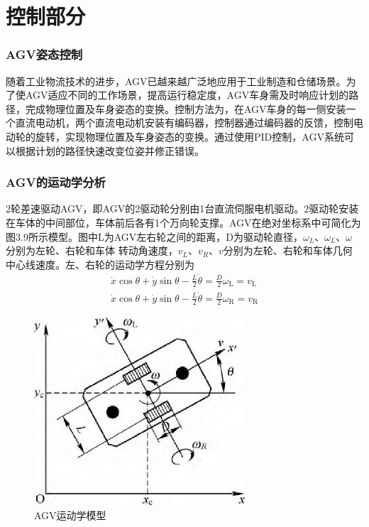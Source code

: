 \documentclass[cs4size,a4paper]{ctexart}
\numberwithin{equation}{section}
\numberwithin{table}{section}
\numberwithin{figure}{section}
\begin{document}
\section{控制部分}
\subsubsection{AGV姿态控制}
随着工业物流技术的进步，AGV已越来越广泛地应用于工业制造和仓储场景。为了使AGV适应不同的工作场景，提高运行稳定度，AGV车身需及时响应计划的路径，完成物理位置及车身姿态的变换。控制方法为，在AGV车身的每一侧安装一个直流电动机，两个直流电动机安装有编码器，控制器通过编码器的反馈，控制电动轮的旋转，实现物理位置及车身姿态的变换。通过使用PID控制，AGV系统可以根据计划的路径快速改变位姿并修正错误。
\subsubsection{AGV的运动学分析}
2轮差速驱动AGV，即AGV的2驱动轮分别由1台直流伺服电机驱动。2驱动轮安装在车体的中间部位，车体前后各有1个万向轮支撑。AGV在绝对坐标系中可简化为图3.9所示模型\cite{杨远航基于模糊控制的}。图中L为AGV左右轮之间的距离，D为驱动轮直径，$\omega_{L}$、$\omega_{L}$、$\omega$ 分别为左轮、右轮和车体 转动角速度，$v_{L}$、$v_{R}$、$v$分别为左轮、右轮和车体几何 中心线速度。左、右轮的运动学方程分别为
\begin{align}
        \dot{x} \cos \theta+\dot{y} \sin \theta-\frac{L}{2} \dot{\theta}=\frac{D}{2} \omega_{\mathrm{L}}=v_{\mathrm{L}}\\ \dot{x} \cos \theta+\dot{y} \sin \theta-\frac{L}{2} \dot{\theta}=\frac{D}{2} \omega_{\mathrm{R}}=v_{\mathrm{R}}
\end{align}
\begin{figure}[H]
    \centering
    \includegraphics[width=0.7\textwidth]{figure/AGVkinematics.jpg}
    \caption{AGV运动学模型}
\end{figure}
\end{document}
